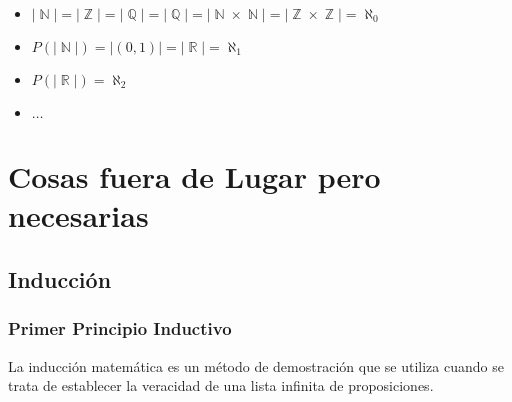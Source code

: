 \documentclass[12pt, fleqn]{report}                             %
\DeclareMathOperator \Naturals  {\mathbb{N}}                     %
\DeclareMathOperator \Integers  {\mathbb{Z}}                     %
\DeclareMathOperator \Racionals {\mathbb{Q}}                     %
\DeclareMathOperator \Reals     {\mathbb{R}}                     %
\begin{document}
            \begin{itemize} 
                \item $|\Naturals| = |\Integers| = |\Racionals| = |\Racionals|
                                   = |\Naturals \times \Naturals| = |\Integers \times \Integers| = \aleph_0$

                \item $P(|\Naturals|) = |(0, 1)| = |\Reals| = \aleph_1$

                \item $P(|\Reals|) = \aleph_2$

                \item $\dots$

            \end{itemize} 








\part{Cosas fuera de Lugar pero necesarias}

    \chapter{Inducción}
        \clearpage



        \clearpage
        \section{Primer Principio Inductivo}

            La inducción matemática es un método de demostración que se utiliza cuando se trata
            de establecer la veracidad de una lista infinita de proposiciones.
\end{document}
